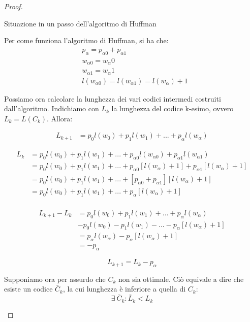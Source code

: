 \begin{teorema}
\begin{proof}
\begin{itemize}
\begin{table}[htbp]
\begin{center}
     \caption{Situazione in un passo dell'algoritmo di Huffman}
    \label{tab:huffdim}
  \end{center}
\end{table}

Per come funziona l'algoritmo di Huffman, si ha che:
\[ \begin{split}
 &p_{\alpha} =p_{\alpha0}+p_{\alpha1} \\
 &w_{\alpha0} =w_{\alpha}0 \\
 &w_{\alpha1}=w_{\alpha}1 \\
 &l(w_{\alpha0})=l(w_{\alpha1})=l(w_{\alpha})+1
 \end{split}
\]

Possiamo ora calcolare la lunghezza dei vari codici intermedi costruiti dall'algoritmo.
Indichiamo con $L_k$ la lunghezza del codice k-esimo, ovvero $L_k=L(C_k)$.
Allora:

\[\begin{split}
 L_{k+1}&=p_0 l(w_0) + p_1 l(w_1) + ... + p_{\alpha} l(w_{\alpha})
  \end{split}
\]

\[ \begin{split}
 L_{k} &=p_0 l(w_0) + p_1 l(w_1) + ... + p_{\alpha0} l(w_{\alpha0}) + p_{\alpha1} l(w_{\alpha1}) \\
       &=p_0 l(w_0) + p_1 l(w_1) + ... + p_{\alpha0} [l(w_{\alpha})+1] + p_{\alpha1} [l(w_{\alpha})+1] \\
       &=p_0 l(w_0) + p_1 l(w_1) + ... + [p_{\alpha0}+p_{\alpha1}][l(w_{\alpha})+1] \\
       &=p_0 l(w_0) + p_1 l(w_1) + ... + p_{\alpha}[l(w_{\alpha})+1] \\
 \end{split}
\]

\[\begin{split}
 L_{k+1}-L_{k}&=p_0 l(w_0) + p_1 l(w_1) + ... + p_{\alpha} l(w_{\alpha}) \\
              &-p_0 l(w_0) - p_1 l(w_1) - ... - p_{\alpha}[l(w_{\alpha})+1] \\
              &=p_{\alpha} l(w_{\alpha}) - p_{\alpha}[l(w_{\alpha})+1] \\
              &=-p_{\alpha}
 \end{split}
\]

\[
 L_{k+1}=L_{k}-p_{\alpha}
\]



\noindent
Supponiamo ora per assurdo che $C_{k}$ non sia ottimale. Ciò equivale a dire che esiste un codice 
$\bar{C}_k$, la cui lunghezza è inferiore a quella di $C_k$:
\[
 \exists \ \bar{C}_k : \bar{L}_k < L_k
\]


\end{itemize}
\end{proof}
\end{teorema}
